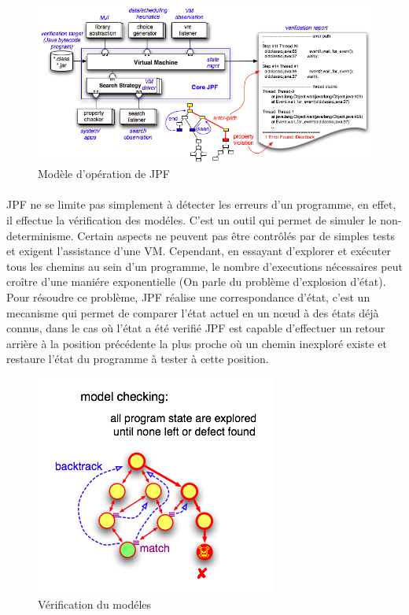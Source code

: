 			\begin{figure}[H]
				\centering
					\includegraphics[scale=0.5]{images/jpf-model.png}
				\caption{Modèle d'opération de \gls{JPF}}
			\end{figure}
	
			\paragraph{}
				\gls{JPF} ne se limite pas simplement à détecter les erreurs d'un programme, en effet, il effectue la vérification des modéles.
				C'est un outil qui permet de simuler le non-determinisme. Certain aspects ne peuvent pas être contrôlés par de simples tests et exigent l'assistance d'une \gls{VM}.
				Cependant, en essayant d'explorer et exécuter tous les chemins au sein d'un programme, le nombre d'executions nécessaires peut croître d'une maniére exponentielle (On parle du problème d'explosion d'état). 
				Pour résoudre ce problème, \gls{JPF} réalise une correspondance d'état, c'est un mecanisme qui permet de comparer
				l'état actuel en un n\oe{}ud à des états déjà connus, dans le cas où l'état
				a été verifié \gls{JPF} est capable d'effectuer un retour arrière à la position précédente la plus proche où un chemin inexploré existe et restaure l'état du programme à tester à cette position.
	
			\begin{figure}[H]
				\centering
					\includegraphics[scale=0.5]{images/jpf-model-checking.png}
				\caption{Vérification du modéles}
			\end{figure}
      

